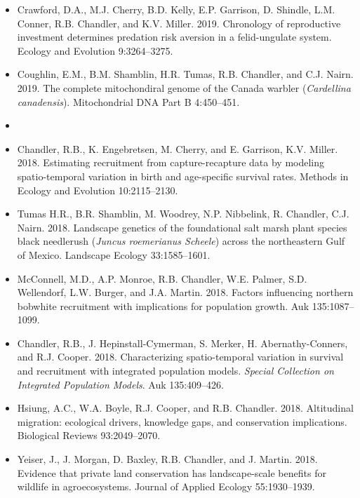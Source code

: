 \begin{itemize}
\item Crawford, D.A., M.J. Cherry, B.D. Kelly, E.P. Garrison,
  D. Shindle, L.M. Conner, R.B. Chandler, and
  K.V. Miller. 2019. Chronology of reproductive investment determines
  predation risk aversion in a felid-ungulate system. Ecology and
  Evolution 9:3264--3275. 

\item Coughlin, E.M., B.M. Shamblin, H.R. Tumas, R.B. Chandler, and
  C.J. Nairn. 2019. The complete mitochondiral genome of the
  Canada warbler ({\it Cardellina canadensis}). Mitochondrial DNA Part
  B 4:450--451.

  
\item[] { \\}

\item Chandler, R.B., K. Engebretsen, M. Cherry, and E. Garrison, 
  K.V. Miller. 2018. Estimating recruitment from
  capture-recapture data by modeling spatio-temporal variation in
  birth and age-specific survival rates. Methods in Ecology and
  Evolution 10:2115--2130.

\item Tumas H.R., B.R. Shamblin, M. Woodrey, N.P. Nibbelink,
  R. Chandler, C.J. Nairn. 2018. Landscape genetics of the
  foundational salt marsh plant species black needlerush ({\it Juncus
    roemerianus Scheele}) across the northeastern Gulf of
  Mexico. Landscape Ecology 33:1585--1601.
  
\item McConnell, M.D., A.P. Monroe, R.B. Chandler, W.E. Palmer,
  S.D. Wellendorf, L.W. Burger, and J.A. Martin. 2018. Factors
  influencing northern bobwhite recruitment with implications for
  population growth. Auk 135:1087--1099.
  
\item Chandler, R.B., J. Hepinstall-Cymerman, S. Merker, H. Abernathy-Conners,
  and R.J. Cooper. 2018. Characterizing spatio-temporal 
  variation in survival and recruitment with integrated population
  models. {\it Special Collection on Integrated Population
    Models}. Auk 135:409--426. 

\item Hsiung, A.C., W.A. Boyle, R.J. Cooper, and
  R.B. Chandler. 2018. Altitudinal migration: ecological drivers,
  knowledge gaps, and conservation implications. Biological Reviews 
  93:2049--2070. 

\item Yeiser, J., J. Morgan, D. Baxley, R.B. Chandler, and
  J. Martin. 2018. Evidence that private land conservation
  has landscape-scale benefits for wildlife in agroecosystems. Journal
  of Applied Ecology 55:1930--1939. 


\end{itemize}
